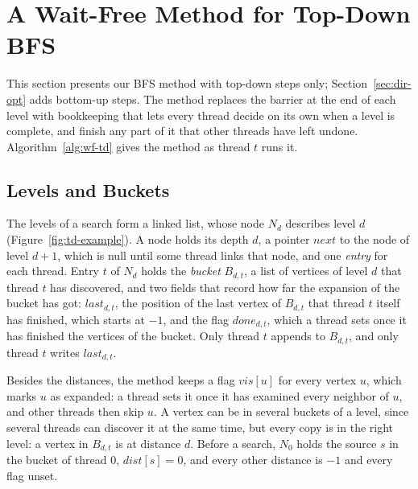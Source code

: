 \section{A Wait-Free Method for Top-Down BFS}
\label{sec:wf-topdown}

This section presents our BFS method with top-down steps only; Section~\ref{sec:dir-opt} adds bottom-up steps. The method replaces the barrier at the end of each level with bookkeeping that lets every thread decide on its own when a level is complete, and finish any part of it that other threads have left undone. Algorithm~\ref{alg:wf-td} gives the method as thread $t$ runs it.

\subsection{Levels and Buckets}
\label{sec:td-structure}

The levels of a search form a linked list, whose node $N_d$ describes level $d$ (Figure~\ref{fig:td-example}). A node holds its depth $d$, a pointer $\mathit{next}$ to the node of level $d+1$, which is null until some thread links that node, and one \emph{entry} for each thread. Entry $t$ of $N_d$ holds the \emph{bucket} $B_{d,t}$, a list of vertices of level $d$ that thread $t$ has discovered, and two fields that record how far the expansion of the bucket has got: $\mathit{last}_{d,t}$, the position of the last vertex of $B_{d,t}$ that thread $t$ itself has finished, which starts at $-1$, and the flag $\mathit{done}_{d,t}$, which a thread sets once it has finished the vertices of the bucket. Only thread $t$ appends to $B_{d,t}$, and only thread $t$ writes $\mathit{last}_{d,t}$.

Besides the distances, the method keeps a flag $\mathit{vis}[u]$ for every vertex $u$, which marks $u$ as expanded: a thread sets it once it has examined every neighbor of $u$, and other threads then skip $u$. A vertex can be in several buckets of a level, since several threads can discover it at the same time, but every copy is in the right level: a vertex in $B_{d,t}$ is at distance $d$. Before a search, $N_0$ holds the source $s$ in the bucket of thread $0$, $\mathit{dist}[s] = 0$, and every other distance is $-1$ and every flag unset.

